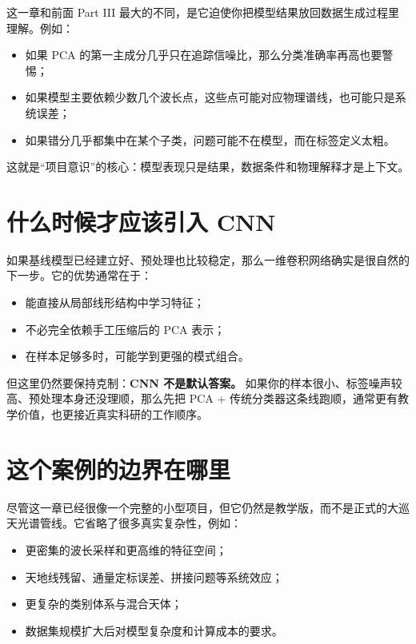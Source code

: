 这一章和前面 Part III 最大的不同，是它迫使你把模型结果放回数据生成过程里理解。例如：

\begin{itemize}
    \item 如果 PCA 的第一主成分几乎只在追踪信噪比，那么分类准确率再高也要警惕；
    \item 如果模型主要依赖少数几个波长点，这些点可能对应物理谱线，也可能只是系统误差；
    \item 如果错分几乎都集中在某个子类，问题可能不在模型，而在标签定义太粗。
\end{itemize}

这就是“项目意识”的核心：模型表现只是结果，数据条件和物理解释才是上下文。

\section{什么时候才应该引入 CNN}

如果基线模型已经建立好、预处理也比较稳定，那么一维卷积网络确实是很自然的下一步。它的优势通常在于：

\begin{itemize}
    \item 能直接从局部线形结构中学习特征；
    \item 不必完全依赖手工压缩后的 PCA 表示；
    \item 在样本足够多时，可能学到更强的模式组合。
\end{itemize}

但这里仍然要保持克制：\textbf{CNN 不是默认答案。} 如果你的样本很小、标签噪声较高、预处理本身还没理顺，那么先把 PCA + 传统分类器这条线跑顺，通常更有教学价值，也更接近真实科研的工作顺序。

\section{这个案例的边界在哪里}

尽管这一章已经很像一个完整的小型项目，但它仍然是教学版，而不是正式的大巡天光谱管线。它省略了很多真实复杂性，例如：

\begin{itemize}
    \item 更密集的波长采样和更高维的特征空间；
    \item 天地线残留、通量定标误差、拼接问题等系统效应；
    \item 更复杂的类别体系与混合天体；
    \item 数据集规模扩大后对模型复杂度和计算成本的要求。
\end{itemize}

